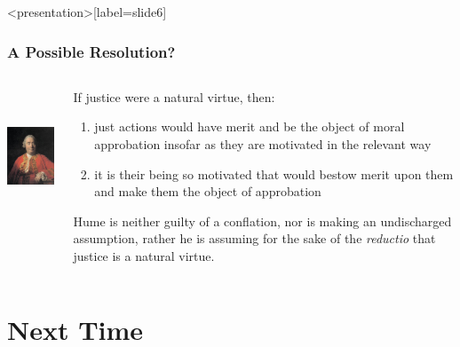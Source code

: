 % 

\begin{frame}<presentation>[label=slide6]
    \frametitle{A Possible Resolution?}
        \begin{columns}
            \begin{column}{3cm}
                \includegraphics[height=4cm]{../../graphics/hume.jpg}
            \end{column}
            \begin{column}{7cm}
                If justice were a natural virtue, then:
                    \begin{enumerate}
                        \item just actions would have merit and be the object of moral approbation insofar as they are motivated in the relevant way
                        \item it is their being so motivated that would bestow merit upon them and make them the object of approbation
                    \end{enumerate}
                Hume is neither guilty of a conflation, nor is making an undischarged assumption, rather he is assuming for the sake of the \emph{reductio} that justice is a natural virtue.
            \end{column}
        \end{columns}
\end{frame}


\section{Next Time}\label{sec:next_time} %

